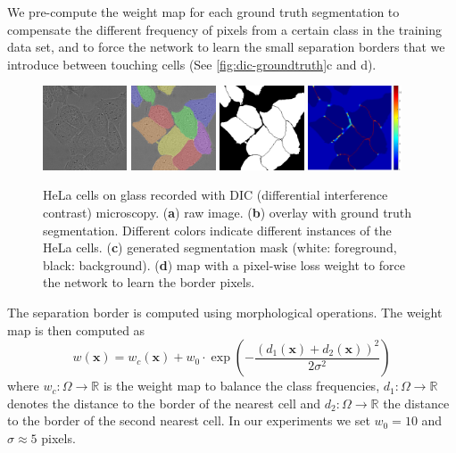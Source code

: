 \documentclass{llncs}
\renewcommand{\vec}[1]{\boldsymbol{\mathbf{#1}}}
\begin{document}
We pre-compute the weight map for each ground truth segmentation to compensate the different frequency of pixels from a certain class in the training data set, and to force the network to learn the small separation borders that we introduce between touching cells (See \autoref{fig:dic-groundtruth}c and d).
\begin{figure}[tbp]
  \centering
  \includegraphics[height=25mm]{DIC-C2DH-HeLa-02-t038}
  \includegraphics[height=25mm]{DIC-C2DH-HeLa-02-t038-overlay}
  \includegraphics[height=25mm]{DIC-C2DH-HeLa-02-t038-mask}
  \includegraphics[height=25mm]{weightmap}
  \caption{HeLa cells on glass recorded with DIC (differential interference contrast) microscopy. (\textbf{a}) raw image. (\textbf{b}) overlay with ground truth segmentation. Different colors indicate different instances of the HeLa cells. (\textbf{c}) generated segmentation mask (white: foreground, black: background). (\textbf{d}) map with a pixel-wise loss weight to force the network to learn the border pixels.}
  \label{fig:dic-groundtruth}

\end{figure}


 The separation border is computed using morphological operations. The weight map is then computed as
\begin{equation}
  w(\vec{x}) = w_c(\vec{x}) + w_0 \cdot \exp\left( - \frac{(d_1(\vec{x}) + d_2(\vec{x}))^2}{2\sigma^2}\right) 
\end{equation}
where  $w_c:\Omega \rightarrow \mathds{R}$ is the weight map to balance the class frequencies, $d_1:\Omega \rightarrow \mathds{R}$ denotes the distance to the border of the nearest cell and $d_2:\Omega \rightarrow \mathds{R}$ the distance to the border of the second nearest cell. In our experiments we set $w_0 = 10$ and $\sigma \approx 5 $ pixels.
\end{document}
